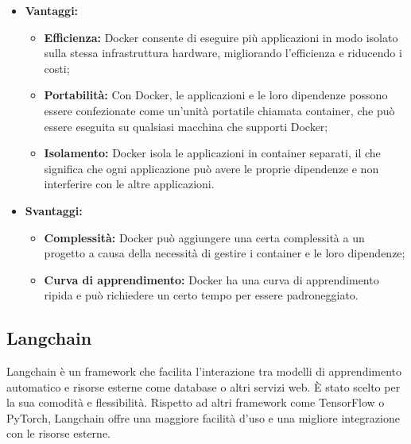 \documentclass[10pt, a4paper]{article}
\begin{document}
\begin{itemize}
\item \textbf{Vantaggi:}
\begin{itemize}
\item \textbf{Efficienza:} Docker consente di eseguire più applicazioni in modo isolato sulla stessa infrastruttura hardware, migliorando l'efficienza e riducendo i costi;
\item \textbf{Portabilità:} Con Docker, le applicazioni e le loro dipendenze possono essere confezionate come un'unità portatile chiamata container, che può essere eseguita su qualsiasi macchina che supporti Docker;
\item \textbf{Isolamento:} Docker isola le applicazioni in container separati, il che significa che ogni applicazione può avere le proprie dipendenze e non interferire con le altre applicazioni.
\end{itemize}
\item \textbf{Svantaggi:}
\begin{itemize}
\item \textbf{Complessità:} Docker può aggiungere una certa complessità a un progetto a causa della necessità di gestire i container e le loro dipendenze;
\item \textbf{Curva di apprendimento:} Docker ha una curva di apprendimento ripida e può richiedere un certo tempo per essere padroneggiato.
\end{itemize}
\end{itemize}

\subsection{Langchain}
Langchain è un framework che facilita l'interazione tra modelli di apprendimento automatico e risorse esterne come database o altri servizi web. È stato scelto per la sua comodità e flessibilità. Rispetto ad altri framework come TensorFlow o PyTorch, Langchain offre una maggiore facilità d'uso e una migliore integrazione con le risorse esterne.
\end{document}
